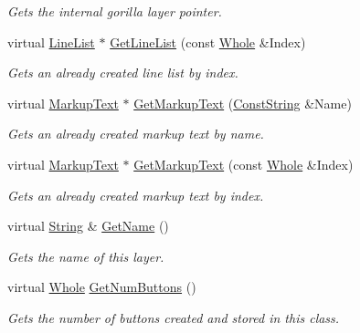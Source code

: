 \begin{DoxyCompactItemize}
\begin{DoxyCompactList}\small\item\em Gets the internal gorilla layer pointer. \item\end{DoxyCompactList}\item 
virtual \hyperlink{classphys_1_1UI_1_1LineList}{LineList} $\ast$ \hyperlink{classphys_1_1UI_1_1Layer_aa0ec04b512d7c2ad2808a2dc0e435905}{GetLineList} (const \hyperlink{namespacephys_a460f6bc24c8dd347b05e0366ae34f34a}{Whole} \&Index)
\begin{DoxyCompactList}\small\item\em Gets an already created line list by index. \item\end{DoxyCompactList}\item 
virtual \hyperlink{classphys_1_1UI_1_1MarkupText}{MarkupText} $\ast$ \hyperlink{classphys_1_1UI_1_1Layer_aed2d7a1ad478f3d92005aeec4a777473}{GetMarkupText} (\hyperlink{namespacephys_a5ce5049f8b4bf88d6413c47b504ebb31}{ConstString} \&Name)
\begin{DoxyCompactList}\small\item\em Gets an already created markup text by name. \item\end{DoxyCompactList}\item 
virtual \hyperlink{classphys_1_1UI_1_1MarkupText}{MarkupText} $\ast$ \hyperlink{classphys_1_1UI_1_1Layer_ae69320aefcfbc6f7f8c7364a04b2ae59}{GetMarkupText} (const \hyperlink{namespacephys_a460f6bc24c8dd347b05e0366ae34f34a}{Whole} \&Index)
\begin{DoxyCompactList}\small\item\em Gets an already created markup text by index. \item\end{DoxyCompactList}\item 
virtual \hyperlink{namespacephys_aa03900411993de7fbfec4789bc1d392e}{String} \& \hyperlink{classphys_1_1UI_1_1Layer_a362edb47fdc9aa595dcaffc1ed617ae4}{GetName} ()
\begin{DoxyCompactList}\small\item\em Gets the name of this layer. \item\end{DoxyCompactList}\item 
virtual \hyperlink{namespacephys_a460f6bc24c8dd347b05e0366ae34f34a}{Whole} \hyperlink{classphys_1_1UI_1_1Layer_acebe9d678fe60e02fa4d37647bb9780c}{GetNumButtons} ()
\begin{DoxyCompactList}\small\item\em Gets the number of buttons created and stored in this class. \item\end{DoxyCompactList}\item 

\end{DoxyCompactItemize}
